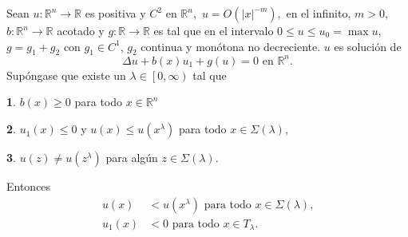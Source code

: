 



\begin{lemma}
Sean $u:\mathbb{R}^{n}\rightarrow\mathbb{R}$ es positiva y $C^{2}$ en
$\mathbb{R}^{n},$ $u=O(\left\vert x\right\vert ^{-m}),$ en el infinito, $m>0,$
$b:\mathbb{R}^{n}\rightarrow\mathbb{R}$ acotado y $g:\mathbb{R}\rightarrow
\mathbb{R}$ es tal que en el intervalo $0\leq u\leq u_{0}=\max u$,
$g=g_{1}+g_{2}$ con $g_{1}\in C^{1}$, $g_{2}$ continua y mon\'{o}tona no
decreciente. $u$ es soluci\'{o}n de
\begin{equation}
\Delta u+b\left(  x\right)  u_{1}+g\left(  u\right)  =0\text{ \ \ en\ }%
\mathbb{R}^{n}\text{.}\tag{13}%
\end{equation}
Sup\'{o}ngase que existe un $\lambda\in\left[  0,\infty\right)  $ tal que

\textbf{1}. $b\left(  x\right)  \geq0$ para todo $x\in\mathbb{R}^{n}$

\textbf{2}. $u_{1}\left(  x\right)  \leq0$ y $u\left(  x\right)  \leq u\left(
x^{\lambda}\right)  $ para todo $x\in\Sigma\left(  \lambda\right)  $,

\textbf{3}. $u\left(  z\right)  \neq u\left(  z^{\lambda}\right)  $ para
alg\'{u}n $z\in\Sigma\left(  \lambda\right)  $.

Entonces
\begin{align*}
u\left(  x\right)    & <u\left(  x^{\lambda}\right)  \text{ \ \ para todo
\ }x\in\Sigma\left(  \lambda\right)  \text{,}\\
u_{1}\left(  x\right)    & <0\text{ \ \ para todo \ }x\in T_{\lambda}\text{.}%
\end{align*}

\end{lemma}
